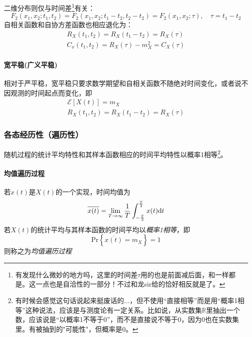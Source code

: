        二维分布则仅与时间差\footnote{有发现什么微妙的地方吗，这里的时间差$\tau$用的也是前面减后面，和一样都是。这一点也是\textcolor{bupt}{自洽性}的一部分！不过和龙sir给的恰好相反就是了。}有关：
        \begin{equation}
            F_2(x_1,x_2;t_1,t_2)=F_2(x_1,x_2;t_1-t_2,t_2-t_2)=F_2(x_1,x_2;\tau),\hspace{1em}\tau=t_1-t_2
        \end{equation}
        自相关函数和自协方差函数也相应退化为：
        \begin{align}
            R_X(t_1,t_2)=R_X(t_1-t_2)=R_X(\tau)\\
            C_x(t_1,t_2)=R_X(\tau)-m_X^2=C_X(\tau)
        \end{align}

        \paragraph{宽平稳(广义平稳)}
        相对于严平稳，宽平稳只要求数学期望和自相关函数不随绝对时间变化，或者说不因观测的时间起点而变化，即
        \begin{align}
            \mathscr{E}[X(t)]=m_X\hspace{5em}\\
            R_X(t_1,t_2)=R_X(t_1-t_2)=R_X(\tau)
        \end{align}

    \subsubsection[各态经历性]{各态经历性（遍历性）}
    随机过程的统计平均特性和其样本函数相应的时间平均特性以概率1相等\footnote{有时候会感觉这句话说起来挺废话的$\ldots$，但不使用“直接相等”而是用“概率1相等”这种说法，应该是与测度论有一定关系。比如说，从实数集$\mathbb{R}$里抽出一个数，应该说是“以概率1不等于0”，而不是直接说不等于0，因为0也在实数集里。有被抽到的"可能性"，但概率是0。}。

    \paragraph{均值遍历过程}\mbox{}

    若$x(t)$是$X(t)$的一个实现，时间均值为
    \begin{equation}
        \overline{x(t)}=\lim_{T\to\infty}\frac{1}{T}\int_{-\frac{T}{2}}^{\frac{T}{2}}x(t)\text{\upshape d} t
    \end{equation}
    若$X(t)$的统计平均与其样本函数的时间平均以\emph{概率1相等}，即
    \begin{equation}
        \text{Pr}\left\{\overline{x(t)}=m_X \right\}=1
    \end{equation}
    则称之为\emph{均值遍历过程}

